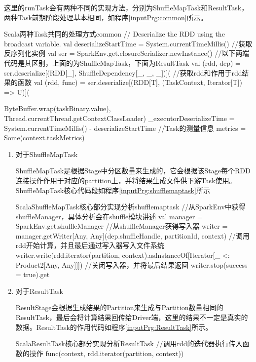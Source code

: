 这里的runTask会有两种不同的实现方法，分别为ShuffleMapTask和ResultTask，两种Task前期阶段处理基本相同，如程序\ref{inputPrg:common}所示。
\begin{codeInput}{Scala}{两种Task共同的处理方式}{common}
// Deserialize the RDD using the broadcast variable.
val deserializeStartTime = System.currentTimeMillis()
//获取反序列化实例
val ser = SparkEnv.get.closureSerializer.newInstance()
//以下两端代码是其区别，上面的为ShuffleMapTask，下面为ResultTask
val (rdd, dep) = ser.deserialize[(RDD[_], ShuffleDependency[_, _, _])](
//获取rdd和作用于rdd结果的函数
val (rdd, func) = ser.deserialize[(RDD[T], (TaskContext, Iterator[T]) => U)](

ByteBuffer.wrap(taskBinary.value), Thread.currentThread.getContextClassLoader)
_executorDeserializeTime = System.currentTimeMillis() - deserializeStartTime
//Task的测量信息
metrics = Some(context.taskMetrics)
\end{codeInput}
\begin{enumerate}[\bfseries 1]
	\item 对于ShuffleMapTask
	
	ShuffleMapTask是根据Stage中分区数量来生成的，它会根据该Stage每个RDD连接操作作用于对应的partition上，并将结果生成文件供下游Task使用。ShuffleMapTask核心代码段如程序\ref{inputPrg:shufflemaptask}所示
\begin{codeInput}{Scala}{ShuffleMapTask核心部分实现分析}{shufflemaptask}
//从SparkEnv中获得shuffleManager，具体分析会在shuffle模块讲述
val manager = SparkEnv.get.shuffleManager
//从shuffleManager获得写入器
writer = manager.getWriter[Any, Any](dep.shuffleHandle, partitionId, context)
//调用rdd开始计算，并且最后通过写入器写入文件系统
writer.write(rdd.iterator(partition, context).asInstanceOf[Iterator[_ <: Product2[Any, Any]]])
//关闭写入器，并将最后结果返回
writer.stop(success = true).get
\end{codeInput}
	\item 对于ResultTask
	
	ResultStage会根据生成结果的Partition来生成与Partition数量相同的ResultTask，最后会将计算结果回传给Driver端，这里的结果不一定是真实的数据。ResultTask的作用代码如程序\ref{inputPrg:ResultTask}所示。
\begin{codeInput}{Scala}{ResultTask核心部分实现分析}{ResultTask}
//调用rdd的迭代器执行传入函数的操作
func(context, rdd.iterator(partition, context))
\end{codeInput}
\end{enumerate}

